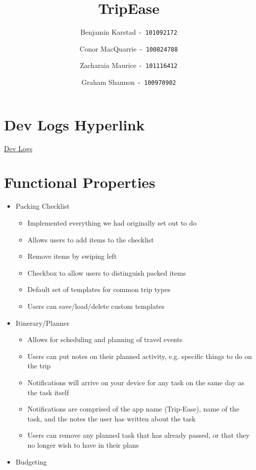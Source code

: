 \documentclass[12pt]{article}
\title{TripEase}
\author{
Benjamin Karstad
\texttt{- 101092172}
\and
Conor MacQuarrie
\texttt{- 100824788}
\and
Zacharaia Maurice
\texttt{- 101116412}
\and
Graham Shannon
\texttt{- 100970902}
}
\begin{document}
	\maketitle

	\section*{Dev Logs Hyperlink}
		\href{https://github.com/theArcticGiant/comp3004-f20/tree/master/app/src/docs/dev logs}{Dev Logs}


	\section*{Functional Properties}

	\begin{itemize}

		\item{Packing Checklist}
			\begin{itemize}
				\item Implemented everything we had originally set out to do
				\item Allows users to add items to the checklist
				\item Remove items by swiping left
				\item Checkbox to allow users to distinguish packed items
				\item Default set of templates for common trip types
				\item Users can save/load/delete custom templates
			\end{itemize}

		\item{Itinerary/Planner}
			\begin{itemize}
				\item Allows for scheduling and planning of travel events
				\item Users can put notes on their planned activity, e.g. specific things to do on the trip
				\item Notifications will arrive on your device for any task on the same day as the task itself
				\item Notifications are comprised of the app name (Trip-Ease), name of the task, and the notes the user has written about the task
				\item Users can remove any planned task that has already passed, or that they no longer wish to have in their plans
			\end{itemize}
		\item{Budgeting}


\end{itemize}
\end{document}
